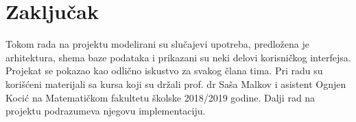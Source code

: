 \section{Zaključak}
Tokom rada na projektu modelirani su slučajevi upotreba, predložena je arhitektura, shema baze podataka i prikazani su neki delovi korisničkog interfejsa. Projekat se pokazao kao odlično iskustvo za svakog člana tima.
Pri radu su korišćeni materijali sa kursa koji su držali prof. dr Saša Malkov i asistent Ognjen Kocić na Matematičkom fakultetu školske 2018/2019 godine.
Dalji rad na projektu podrazumeva njegovu implementaciju.
